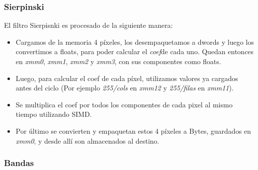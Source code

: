 \documentclass[a4paper]{article}
\begin{document}
\subsubsection{Sierpinski}
El filtro Sierpisnki es procesado de la siguiente manera:

\begin{itemize}
\item Cargamos de la memoria 4 p\'{i}xeles, los desempaquetamos a dwords y luego los convertimos a floats, para poder calcular el \textit{coef}de cada uno. Quedan entonces en \textit{xmm0}, \textit{xmm1}, \textit{xmm2} y \textit{xmm3}, con sus componentes como floats.\\

\item Luego, para calcular el coef de cada p\'{i}xel, utilizamos valores ya cargados antes del ciclo (Por ejemplo \textit{255/cols} en \textit{xmm12} y \textit{255/filas} en \textit{xmm11}). \\

\item Se multiplica el coef por todos los componentes de cada pixel al mismo tiempo utilizando SIMD. \\

\item Por \'{u}ltimo se convierten y empaquetan estos 4 p\'{i}xeles a Bytes, guardados en \textit{xmm0}, y desde all\'{i} son almacenados al destino. 

\end{itemize}


\subsubsection{Bandas}
\end{document}
